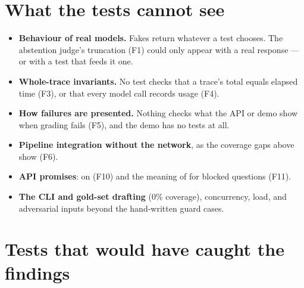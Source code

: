 \section{What the tests cannot see}

\begin{itemize}
  \item \textbf{Behaviour of real models.} Fakes return whatever a test chooses. The abstention judge's truncation (F1) could only appear with a real response --- or with a test that feeds it one.
  \item \textbf{Whole-trace invariants.} No test checks that a trace's total equals elapsed time (F3), or that every model call records usage (F4).
  \item \textbf{How failures are presented.} Nothing checks what the API or demo show when grading fails (F5), and the demo has no tests at all.
  \item \textbf{Pipeline integration without the network}, as the coverage gaps above show (F6).
  \item \textbf{API promises}:  on  (F10) and the meaning of  for blocked questions (F11).
  \item \textbf{The CLI and gold-set drafting} (0\% coverage), concurrency, load, and adversarial inputs beyond the hand-written guard cases.
\end{itemize}

\section{Tests that would have caught the findings}

